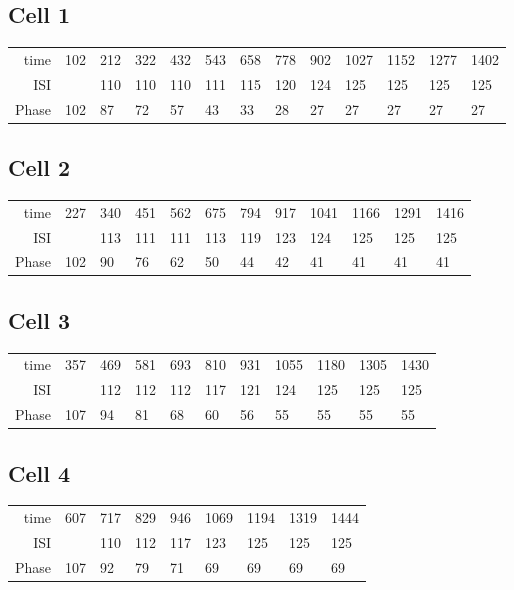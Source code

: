 \subsection{Cell 1}
\begin{tabular}{rllllllllllll}
time&	102&	212&	322&	432&	543&	658&	778&	902&	1027&	1152&	1277&	1402 \\
ISI&	&	110&	110&	110&	111&	115&	120&	124&	125&	125&	125&	125 \\
Phase&	102&	87&	72&	57&	43&	33&	28&	27&	27&	27&	27&	27 \\
\end{tabular}

\subsection{Cell 2}
\begin{tabular}{rlllllllllll}
time&	227&	340&	451&	562&	675&	794&	917&	1041&	1166&	1291&	1416 \\
ISI&	&	113&	111&	111&	113&	119&	123&	124&	125&	125&	125 \\
Phase&	102&	90&	76&	62&	50&	44&	42&	41&	41&	41&	41 \\
\end{tabular}

\subsection{Cell 3}
\begin{tabular}{rllllllllll}
time&	357&	469&	581&	693&	810&	931&	1055&	1180&	1305&	1430 \\
ISI&	&	112&	112&	112&	117&	121&	124&	125&	125&	125 \\
Phase&	107&	94&	81&	68&	60&	56&	55&	55&	55&	55 \\
\end{tabular}

\subsection{Cell 4}
\begin{tabular}{rllllllll}
time&	607&	717&	829&	946&	1069&	1194&	1319&	1444 \\
ISI&	&	110&	112&	117&	123&	125&	125&	125 \\
Phase&	107&	92&	79&	71&	69&	69&	69&	69 \\
\end{tabular}

